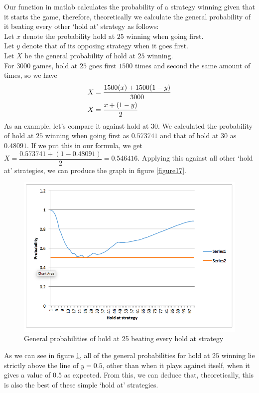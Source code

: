 \documentclass[a4paper,titlepage]{article}
\begin{document}
Our function in matlab calculates the probability of a strategy winning given that it starts the game, therefore, theoretically we calculate the general probability of it beating every other ‘hold at’ strategy as follows:\\Let $x$ denote the probability hold at $25$ winning when going first.\\Let $y$ denote that of its opposing strategy when it goes first.\\Let $X$ be the general probability of hold at $25$ winning.\\For $3000$ games, hold at $25$ goes first $1500$ times and second the same amount of times, so we have
\begin{align}
X &= \dfrac{1500(x)+1500(1-y)}{3000}\notag\\
X &= \dfrac{x+(1-y)}{2}\notag
\end{align}
As an example, let’s compare it against hold at $30$. We calculated the probability of hold at $25$ winning when going first as $0.573741$ and that of hold at $30$ as $0.48091$. If we put this in our formula, we get\\ $X=\dfrac{0.573741+(1-0.48091)}{2}=0.546416$. Applying this against all other ‘hold at’ strategies, we can produce the graph in figure \ref{figure17}.
\begin{figure}
\centering
\includegraphics[width=\textwidth]{stats_3}
\caption{General probabilities of hold at 25 beating every hold at strategy\label{figure18}}
\end{figure}
As we can see in figure \ref{figure18}, all of the general probabilities for hold at $25$ winning lie strictly above the line of $y=0.5$, other than when it plays against itself, when it gives a value of $0.5$ as expected. From this, we can deduce that, theoretically, this is also the best of these simple ‘hold at’ strategies.
\end{document}
